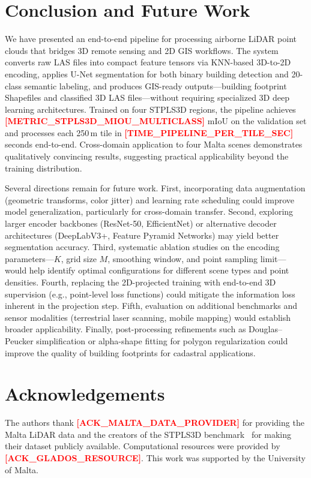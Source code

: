 \documentclass[11pt]{article}
\newcommand{\placeholder}[1]{\textcolor{red}{\textbf{[#1]}}}
\begin{document}
\section{Conclusion and Future Work}
\label{sec:conclusion}

We have presented an end-to-end pipeline for processing airborne LiDAR point clouds that bridges 3D remote sensing and 2D GIS workflows.
The system converts raw LAS files into compact feature tensors via KNN-based 3D-to-2D encoding, applies U-Net segmentation for both binary building detection and 20-class semantic labeling, and produces GIS-ready outputs---building footprint Shapefiles and classified 3D LAS files---without requiring specialized 3D deep learning architectures.
Trained on four STPLS3D regions, the pipeline achieves \placeholder{METRIC\_STPLS3D\_MIOU\_MULTICLASS} mIoU on the validation set and processes each 250\,m tile in \placeholder{TIME\_PIPELINE\_PER\_TILE\_SEC} seconds end-to-end.
Cross-domain application to four Malta scenes demonstrates qualitatively convincing results, suggesting practical applicability beyond the training distribution.

Several directions remain for future work.
First, incorporating data augmentation (geometric transforms, color jitter) and learning rate scheduling could improve model generalization, particularly for cross-domain transfer.
Second, exploring larger encoder backbones (ResNet-50, EfficientNet) or alternative decoder architectures (DeepLabV3+, Feature Pyramid Networks) may yield better segmentation accuracy.
Third, systematic ablation studies on the encoding parameters---$K$, grid size $M$, smoothing window, and point sampling limit---would help identify optimal configurations for different scene types and point densities.
Fourth, replacing the 2D-projected training with end-to-end 3D supervision (e.g., point-level loss functions) could mitigate the information loss inherent in the projection step.
Fifth, evaluation on additional benchmarks and sensor modalities (terrestrial laser scanning, mobile mapping) would establish broader applicability.
Finally, post-processing refinements such as Douglas--Peucker simplification or alpha-shape fitting for polygon regularization could improve the quality of building footprints for cadastral applications.

\section*{Acknowledgements}

The authors thank \placeholder{ACK\_MALTA\_DATA\_PROVIDER} for providing the Malta LiDAR data and the creators of the STPLS3D benchmark~\cite{hu2021stpls3d} for making their dataset publicly available.
Computational resources were provided by \placeholder{ACK\_GLADOS\_RESOURCE}.
This work was supported by the University of Malta.



\end{document}
